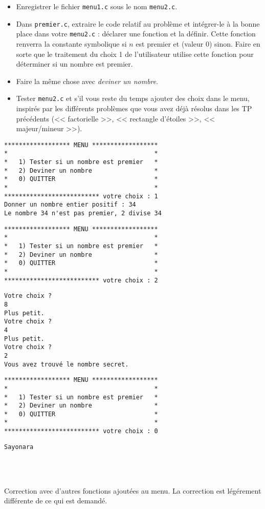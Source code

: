 \begin{itemize}
\item Enregistrer le fichier \verb|menu1.c| sous le nom \verb|menu2.c|.
\item Dans \verb|premier.c|, extraire le code relatif au problème et
  intégrer-le à la bonne place dans votre \verb|menu2.c| : déclarer
  une fonction  et la définir. Cette
  fonction renverra la constante symbolique  si $n$ est
  premier et  (valeur 0) sinon. Faire en sorte que le
  traitement du choix 1 de l'utilisateur utilise cette fonction pour
  déterminer si un nombre est premier.
  \item Faire la même chose avec \emph{deviner un nombre}.

  \item Tester \verb|menu2.c| et s'il vous reste du temps ajouter des
    choix dans le menu, inspirés par les différents problèmes que vous
    avez déjà résolus dans les TP précédents (<< factorielle >>,
   << rectangle d'étoiles >>, << majeur/mineur >>).
\end{itemize}


\begin{multicols}{2} 
\footnotesize\setlength{\columnseprule}{0.3pt}
\begin{verbatim}
****************** MENU ******************
*                                        *
*   1) Tester si un nombre est premier   *
*   2) Deviner un nombre                 *
*   0) QUITTER                           *
*                                        *
************************** votre choix : 1
Donner un nombre entier positif : 34
Le nombre 34 n'est pas premier, 2 divise 34
\end{verbatim}
\begin{verbatim}
****************** MENU ******************
*                                        *
*   1) Tester si un nombre est premier   *
*   2) Deviner un nombre                 *
*   0) QUITTER                           *
*                                        *
************************** votre choix : 2
\end{verbatim}
\begin{verbatim}
Votre choix ?
8
Plus petit.
Votre choix ?
4
Plus petit.
Votre choix ?
2
Vous avez trouvé le nombre secret.
\end{verbatim}
\begin{verbatim}
****************** MENU ******************
*                                        *
*   1) Tester si un nombre est premier   *
*   2) Deviner un nombre                 *
*   0) QUITTER                           *
*                                        *
************************** votre choix : 0
\end{verbatim}
\begin{verbatim}
Sayonara
\end{verbatim}\\[2cm]
 ~
\end{multicols}

\begin{correction}
Correction avec d'autres fonctions ajoutées au menu. La correction est légérement différente de ce qui est demandé.

\end{correction}

